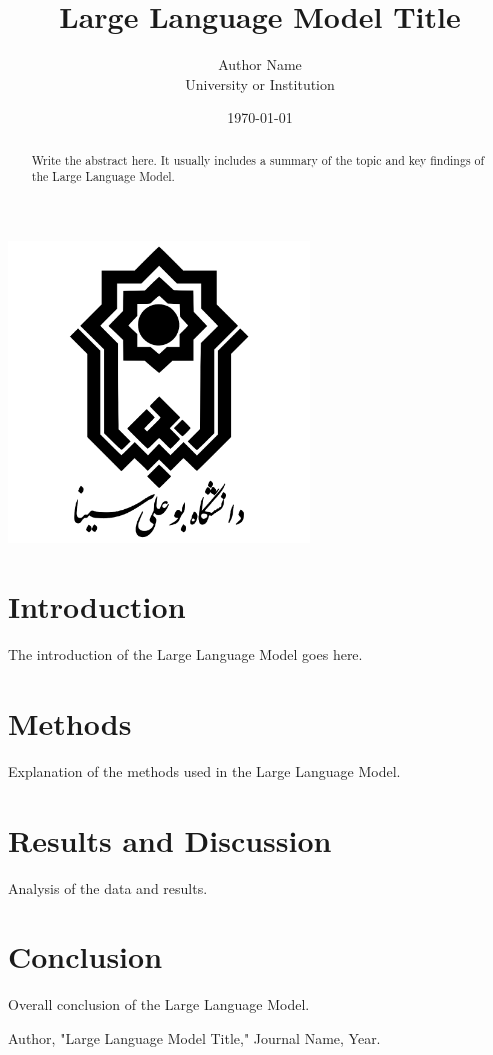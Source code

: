 \documentclass[12pt]{article}
\title{Large Language Model Title}
\author{Author Name \\ University or Institution}
\date{\today}
\begin{document}
\maketitle  %

\begin{center}
    \includegraphics[width=0.6\textwidth]{image/Bu_Ali_Sina_University.png}
\end{center}

\begin{abstract}
Write the abstract here. It usually includes a summary of the topic and key findings of the Large Language Model.
\end{abstract}

\section{Introduction}
The introduction of the Large Language Model goes here.

\section{Methods}
Explanation of the methods used in the Large Language Model.

\section{Results and Discussion}
Analysis of the data and results.

\section{Conclusion}
Overall conclusion of the Large Language Model.

\begin{thebibliography}{9}
 Author, "Large Language Model Title," Journal Name, Year.
\end{thebibliography}
\end{document}
